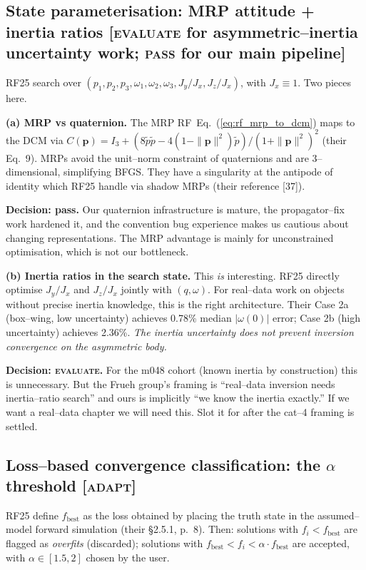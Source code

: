\documentclass[11pt]{article}
\newcommand{\rf}[1]{RF~Eq.~(\ref{#1})}  %
\begin{document}
\subsection{State parameterisation: MRP attitude + inertia ratios \textnormal{[\textsc{evaluate} for asymmetric--inertia uncertainty work; \textsc{pass} for our main pipeline]}}

\noindent
RF25 search over $(p_1, p_2, p_3, \omega_1, \omega_2, \omega_3, J_y/J_x, J_z/J_x)$,
with $J_x \equiv 1$. Two pieces here.

\textbf{(a) MRP vs quaternion.} The MRP \rf{eq:rf_mrp_to_dcm} maps to the
DCM via $C(\mathbf{p}) = I_3 + (8\tilde{p}\tilde{p} - 4(1 - \|\mathbf{p}\|^2)\tilde{p})
/ (1 + \|\mathbf{p}\|^2)^2$ (their Eq.~9). MRPs avoid the
unit--norm constraint of quaternions and are 3--dimensional, simplifying BFGS.
They have a singularity at the antipode of identity which RF25 handle via
shadow MRPs (their reference [37]).

\textbf{Decision: pass.} Our quaternion infrastructure is mature, the
propagator--fix work hardened it, and the convention bug experience
makes us cautious about changing representations. The MRP advantage is mainly
for unconstrained optimisation, which is not our bottleneck.

\textbf{(b) Inertia ratios in the search state.} This \emph{is} interesting.
RF25 directly optimise $J_y/J_x$ and $J_z/J_x$ jointly with $(q, \omega)$.
For real--data work on objects without precise inertia knowledge, this is
the right architecture. Their Case 2a (box--wing, low uncertainty) achieves
0.78\% median $|\omega(0)|$ error; Case 2b (high uncertainty) achieves 2.36\%.
\textit{The inertia uncertainty does not prevent inversion convergence on
the asymmetric body.}

\textbf{Decision: \textsc{evaluate}.} For the m048 cohort (known inertia by
construction) this is unnecessary. But the Frueh group's framing is
``real--data inversion needs inertia--ratio search'' and ours is implicitly
``we know the inertia exactly.'' If we want a real--data chapter we will
need this. Slot it for after the cat--4 framing is settled.

\subsection{Loss--based convergence classification: the $\alpha$ threshold \textnormal{[\textsc{adapt}]}}

\noindent
RF25 define $f_{\mathrm{best}}$ as the loss obtained by placing the truth state
in the assumed--model forward simulation (their \S2.5.1, p.~8). Then:
solutions with $f_i < f_{\mathrm{best}}$ are flagged as \emph{overfits}
(discarded); solutions with $f_{\mathrm{best}} < f_i < \alpha \cdot
f_{\mathrm{best}}$ are accepted, with $\alpha \in [1.5, 2]$ chosen by the
user.
\end{document}
